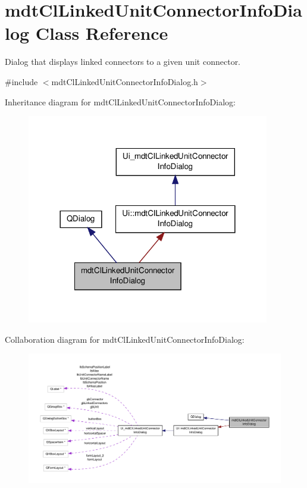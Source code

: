 \hypertarget{classmdt_cl_linked_unit_connector_info_dialog}{\section{mdt\-Cl\-Linked\-Unit\-Connector\-Info\-Dialog Class Reference}
\label{classmdt_cl_linked_unit_connector_info_dialog}
}


Dialog that displays linked connectors to a given unit connector.  




{\ttfamily \#include $<$mdt\-Cl\-Linked\-Unit\-Connector\-Info\-Dialog.\-h$>$}



Inheritance diagram for mdt\-Cl\-Linked\-Unit\-Connector\-Info\-Dialog\-:
\nopagebreak
\begin{figure}[H]
\begin{center}
\leavevmode
\includegraphics[width=300pt]{classmdt_cl_linked_unit_connector_info_dialog__inherit__graph}
\end{center}
\end{figure}


Collaboration diagram for mdt\-Cl\-Linked\-Unit\-Connector\-Info\-Dialog\-:
\nopagebreak
\begin{figure}[H]
\begin{center}
\leavevmode
\includegraphics[width=350pt]{classmdt_cl_linked_unit_connector_info_dialog__coll__graph}
\end{center}
\end{figure}
